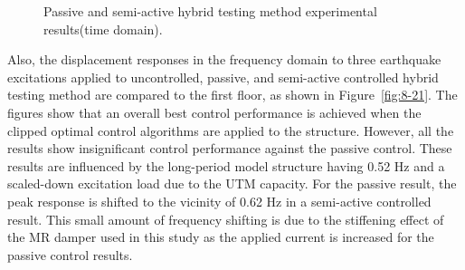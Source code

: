 \begin{figure}[H]
\centering
{}
\caption{Passive and semi-active hybrid testing method experimental results(time domain).}
\label{fig:8-20}
\end{figure}

Also, the displacement responses in the frequency domain to three earthquake excitations applied to uncontrolled, passive, and semi-active controlled hybrid testing method are compared to the first floor, as shown in Figure~\ref{fig:8-21}. The figures show that an overall best control performance is achieved when the clipped optimal control algorithms are applied to the structure. However, all the results show insignificant control performance against the passive control. These results are influenced by the long-period model structure having 0.52 Hz and a scaled-down excitation load due to the UTM capacity. For the passive result, the peak response is shifted to the vicinity of 0.62 Hz in a semi-active controlled result. This small amount of frequency shifting is due to the stiffening effect of the MR damper used in this study as the applied current is increased for the passive control results.


